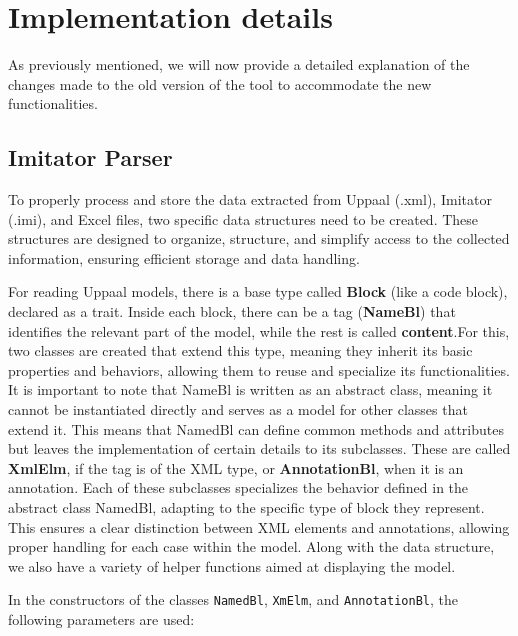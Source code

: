 \section{Implementation details}
As previously mentioned, we will now provide a detailed explanation of the changes made to the old version of the tool to accommodate the new functionalities.
\subsection{Imitator Parser}

To properly process and store the data extracted from Uppaal (.xml), Imitator (.imi), and Excel files, two specific data structures need to be created. These structures are designed to organize, structure, and simplify access to the collected information, ensuring efficient storage and data handling.

For reading Uppaal models, there is a base type called \textbf{Block} (like a code block), declared as a trait. Inside each block, there can be a tag (\textbf{NameBl}) that identifies the relevant part of the model, while the rest is called \textbf{content}.For this, two classes are created that extend this type, meaning they inherit its basic properties and behaviors, allowing them to reuse and specialize its functionalities. It is important to note that NameBl is written as an abstract class, meaning it cannot be instantiated directly and serves as a model for other classes that extend it. This means that NamedBl can define common methods and attributes but leaves the implementation of certain details to its subclasses. These are called \textbf{XmlElm}, if the tag is of the XML type, or \textbf{AnnotationBl}, when it is an annotation. Each of these subclasses specializes the behavior defined in the abstract class NamedBl, adapting to the specific type of block they represent. This ensures a clear distinction between XML elements and annotations, allowing proper handling for each case within the model. Along with the data structure, we also have a variety of helper functions aimed at displaying the model. 

In the constructors of the classes \texttt{NamedBl}, \texttt{XmElm}, and \texttt{AnnotationBl}, the following parameters are used:  


